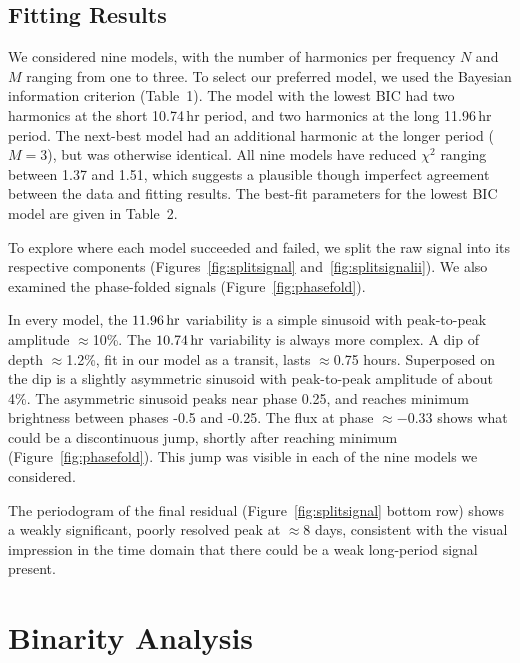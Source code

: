 \documentclass[12pt,twocolumn,tighten]{aastex62}
\newcommand{\ptfo}{PTFO$\,$8-8695}
\begin{document}
\subsection{Fitting Results}

We considered nine models, with the number of harmonics per frequency
$N$ and $M$ ranging from one to three.  To select our preferred model,
we used the Bayesian information criterion (Table~1).  The model with
the lowest BIC had two harmonics at the short 10.74$\,$hr period, and
two harmonics at the long 11.96$\,$hr period.  The next-best model had
an additional harmonic at the longer period ($M=3$), but was otherwise
identical.  All nine models have reduced $\chi^2$ ranging between 1.37
and 1.51, which suggests a plausible though imperfect agreement
between the data and fitting results.  The best-fit parameters for the
lowest BIC model are given in Table~2.

To explore where each model succeeded and failed, we split the raw
signal into its respective components (Figures~\ref{fig:splitsignal}
and~\ref{fig:splitsignalii}).  We also examined the phase-folded
signals (Figure~\ref{fig:phasefold}).  

In every model, the $11.96\,{\rm hr}$ variability is a simple sinusoid
with peak-to-peak amplitude $\approx$10\%.  The $10.74\,{\rm hr}$
variability is always more complex.  A dip of depth $\approx$1.2\%,
fit in our model as a transit, lasts $\approx$0.75 hours.  Superposed
on the dip is a slightly asymmetric sinusoid with peak-to-peak
amplitude of about 4\%. The asymmetric sinusoid peaks near phase 0.25,
and reaches minimum brightness between phases -0.5 and -0.25.  The
flux at phase $\approx -0.33$ shows what could be a discontinuous
jump, shortly after reaching minimum (Figure~\ref{fig:phasefold}).
This jump was visible in each of the nine models we considered.

The periodogram of the final residual (Figure~\ref{fig:splitsignal}
bottom row) shows a weakly significant, poorly resolved peak at
$\approx$8 days, consistent with the visual impression in the time
domain that there could be a weak long-period signal present.



\section{Binarity Analysis}
\label{sec:gaia}

\end{document}
